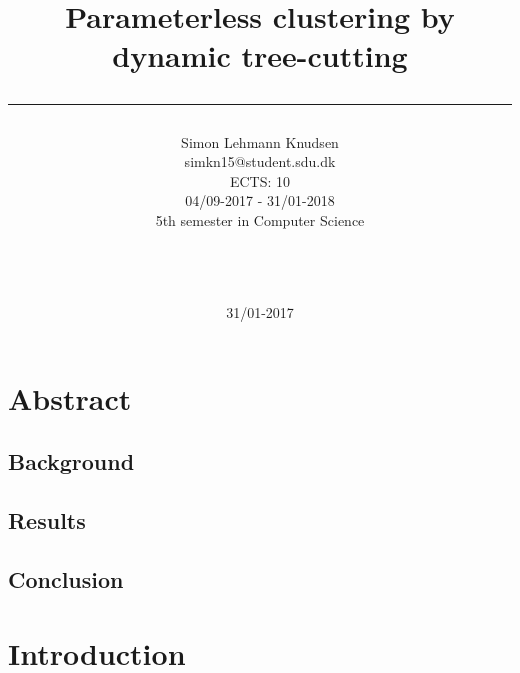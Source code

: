 \documentclass[a4paper,10pt]{article}
\title{ Parameterless clustering by dynamic tree-cutting \rule{10cm}{0.5mm}}
\author{Simon Lehmann Knudsen \\
	simkn15@student.sdu.dk \\
	ECTS: 10 \\
	04/09-2017 - 31/01-2018 \\
	5th semester in Computer Science
\\\rule{5.5cm}{0.5mm}\\}
\date{31/01-2017}
\begin{document}
\maketitle

\newpage
\tableofcontents

\newpage
\section{Abstract}

\subsection{Background}

\subsection{Results}

\subsection{Conclusion}

\newpage
\section{Introduction}
\end{document}
